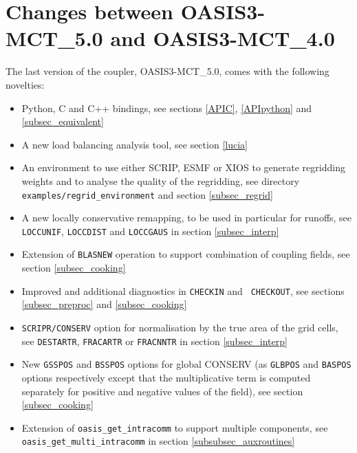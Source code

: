 \section{Changes between OASIS3-MCT\_5.0 and OASIS3-MCT\_4.0}

The last version of the coupler, OASIS3-MCT\_5.0, comes with the
following novelties:

\begin{itemize}

\item Python, C and C++ bindings, see sections \ref{APIC},
  \ref{APIpython} and \ref{subsec_equivalent}

\item A new  load balancing analysis tool, see section \ref{lucia}

\item An environment to use either SCRIP, ESMF or XIOS to
  generate regridding weights and to analyse the quality of the
  regridding, see directory {\tt
    examples/regrid\_environment} and section \ref{subsec_regrid}

 \item A new locally conservative remapping, to be used in particular
   for runoffs, see {\tt LOCCUNIF}, {\tt LOCCDIST} and {\tt LOCCGAUS} in section \ref{subsec_interp}

 \item Extension of {\tt BLASNEW} operation to support combination of
   coupling fields, see section \ref{subsec_cooking}

\item Improved and additional diagnostics in {\tt CHECKIN} and {\tt
    CHECKOUT}, see sections \ref{subsec_preproc}
  and \ref{subsec_cooking}

\item {\tt SCRIPR/CONSERV} option for normalisation by the true area of the grid cells,
  see {\tt DESTARTR}, {\tt FRACARTR} or {\tt FRACNNTR} in section
  \ref{subsec_interp}

\item New {\tt GSSPOS} and {\tt BSSPOS} options for global CONSERV (as
  {\tt GLBPOS} and {\tt BASPOS} options respectively except that the
  multiplicative term is computed separately for positive
  and negative values of the field), see section \ref{subsec_cooking}

  \item Extension of {\tt oasis\_get\_intracomm} to support
  multiple components, see {\tt oasis\_get\_multi\_intracomm} in  section \ref{subsubsec_auxroutines}


\end{itemize}

